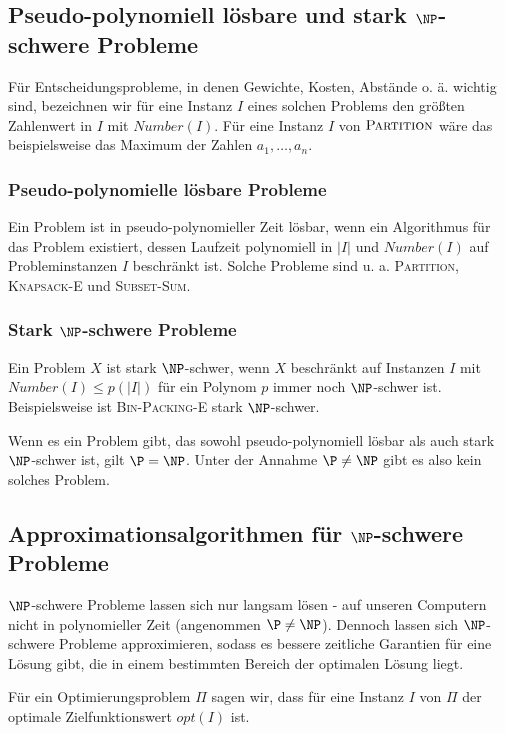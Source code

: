 \documentclass[a4paper,parskip=half*,DIV=7,fontsize=11pt]{scrartcl}
\begin{document}
\subsection{Pseudo-polynomiell lösbare und stark $\NP$-schwere Probleme}
Für Entscheidungsprobleme, in denen Gewichte, Kosten, Abstände o. ä. wichtig sind, bezeichnen wir für eine Instanz $I$ eines solchen Problems den größten Zahlenwert in $I$ mit $Number(I)$. Für eine Instanz $I$ von $\textsc{Partition}$ wäre das beispielsweise das Maximum der Zahlen $a_1,\dots,a_n$.

\subsubsection{Pseudo-polynomielle lösbare Probleme}
Ein Problem ist in pseudo-polynomieller Zeit lösbar, wenn ein Algorithmus für das Problem existiert, dessen Laufzeit polynomiell in $\vert I \vert$ und $Number(I)$ auf Probleminstanzen $I$ beschränkt ist. Solche Probleme sind u. a. \textsc{Partition}, \textsc{Knapsack-E} und \textsc{Subset-Sum}.

\subsubsection{Stark $\NP$-schwere Probleme}
Ein Problem $X$ ist stark $\NP$-schwer, wenn $X$ beschränkt auf Instanzen $I$ mit $Number(I)\leq p(\vert I \vert)$ für ein Polynom $p$ immer noch $\NP$-schwer ist. Beispielsweise ist \textsc{Bin-Packing-E} stark $\NP$-schwer.

Wenn es ein Problem gibt, das sowohl pseudo-polynomiell lösbar als auch stark $\NP$-schwer ist, gilt $\P=\NP$. Unter der Annahme $\P\neq\NP$ gibt es also kein solches Problem.

\subsection[Approximationsalgorithmen für NP-schwere Probleme]{Approximationsalgorithmen für $\NP$-schwere Probleme}
$\NP$-schwere Probleme lassen sich nur langsam lösen - auf unseren Computern nicht in polynomieller Zeit (angenommen $\P \neq \NP$). Dennoch lassen sich $\NP$-schwere Probleme approximieren, sodass es bessere zeitliche Garantien für eine Lösung gibt, die in einem bestimmten Bereich der optimalen Lösung liegt.

Für ein Optimierungsproblem $\Pi$ sagen wir, dass für eine Instanz $I$ von $\Pi$ der optimale Zielfunktionswert $opt(I)$ ist.
\end{document}
